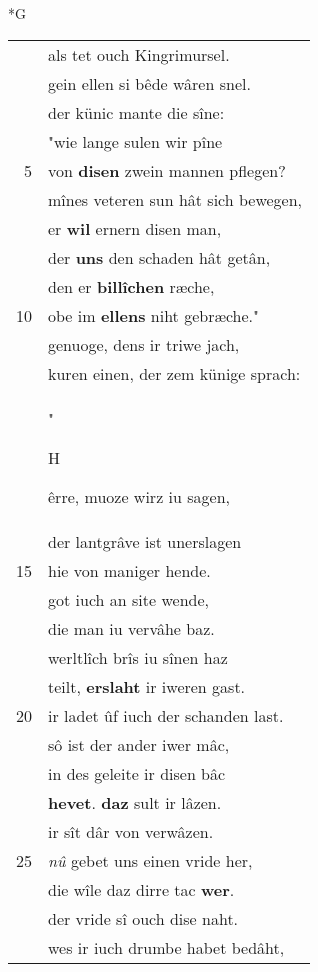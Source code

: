 \documentclass[8pt,a4paper,notitlepage]{article}
\begin{document}
\begin{table}[ht]
\begin{minipage}[t]{0.5\linewidth}
\small
\begin{center}*G
\end{center}
\begin{tabular}{rl}
 & als tet ouch Kingrimursel.\\ 
 & gein ellen si bêde wâren snel.\\ 
 & der künic mante die sîne:\\ 
 & "wie lange sulen wir pîne\\ 
5 & von \textbf{disen} zwein mannen pflegen?\\ 
 & mînes veteren sun hât sich bewegen,\\ 
 & er \textbf{wil} ernern disen man,\\ 
 & der \textbf{uns} den schaden hât getân,\\ 
 & den er \textbf{billîchen} ræche,\\ 
10 & obe im \textbf{ellens} niht gebræche."\\ 
 & genuoge, dens ir triwe jach,\\ 
 & kuren einen, der zem künige sprach:\\ 
 & "\begin{large}H\end{large}êrre, muoze wirz iu sagen,\\ 
 & der lantgrâve ist unerslagen\\ 
15 & hie von maniger hende.\\ 
 & got iuch an site wende,\\ 
 & die man iu vervâhe baz.\\ 
 & werltlîch brîs iu sînen haz\\ 
 & teilt, \textbf{erslaht} ir iweren gast.\\ 
20 & ir ladet ûf iuch der schanden last.\\ 
 & sô ist der ander iwer mâc,\\ 
 & in des geleite ir disen bâc\\ 
 & \textbf{hevet}. \textbf{daz} sult ir lâzen.\\ 
 & ir sît dâr von verwâzen.\\ 
25 & \textit{nû} gebet uns einen vride her,\\ 
 & die wîle daz dirre tac \textbf{wer}.\\ 
 & der vride sî ouch dise naht.\\ 
 & wes ir iuch drumbe habet bedâht,\\ 

\end{tabular}
\end{minipage}
\end{table}
\end{document}
